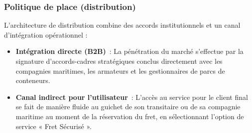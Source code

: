 \subsubsection{Politique de place (distribution)}
L'architecture de distribution combine des accords institutionnels et un canal d'intégration opérationnel :
\begin{itemize}[label=\textcolor{argosblue}{\textbf{>}}]
    \item \textbf{Intégration directe (B2B)}~: La pénétration du marché s'effectue par la signature d'accords-cadres stratégiques conclus directement avec les compagnies maritimes, les armateurs et les gestionnaires de parcs de conteneurs.
    \item \textbf{Canal indirect pour l'utilisateur}~: L'accès au service pour le client final se fait de manière fluide au guichet de son transitaire ou de sa compagnie maritime au moment de la réservation du fret, en sélectionnant l’option de service « Fret Sécurisé ».
\end{itemize}

